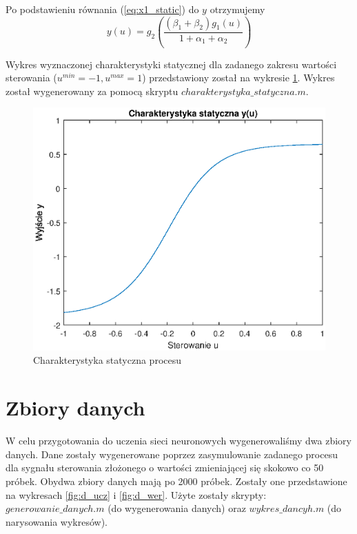 		Po podstawieniu równania (\ref{eq:x1_static}) do $y$ otrzymujemy
		\begin{equation}
			y(u) = g_2(\frac{(\beta_1 + \beta_2)g_1(u)}{1+\alpha_1+\alpha_2}
			\label{eq:y_static})
		\end{equation}
		
		Wykres wyznaczonej charakterystyki statycznej dla zadanego zakresu wartości sterowania ($u^{min}=-1, u^{max} = 1$) przedstawiony został na wykresie \ref{fig:stat}. Wykres został wygenerowany za pomocą skryptu $charakterystyka\_statyczna.m$.
		
		\begin{figure}[h!]
			\centering
			\includegraphics[width=\linewidth]{img/stat.eps}
			\caption{Charakterystyka statyczna procesu}
			\label{fig:stat}
		\end{figure}
		
	\section{Zbiory danych}
		\label{sec:dane}
		
		W celu przygotowania do uczenia sieci neuronowych wygenerowaliśmy dwa zbiory danych. Dane zostały wygenerowane poprzez zasymulowanie zadanego procesu dla sygnału sterowania złożonego o wartości zmieniającej się skokowo co 50 próbek. Obydwa zbiory danych mają po 2000 próbek. Zostały one przedstawione na wykresach \ref{fig:d_ucz} i \ref{fig:d_wer}. Użyte zostały skrypty: $generowanie\_danych.m$ (do wygenerowania danych) oraz $wykres\_dancyh.m$ (do narysowania wykresów).
		
